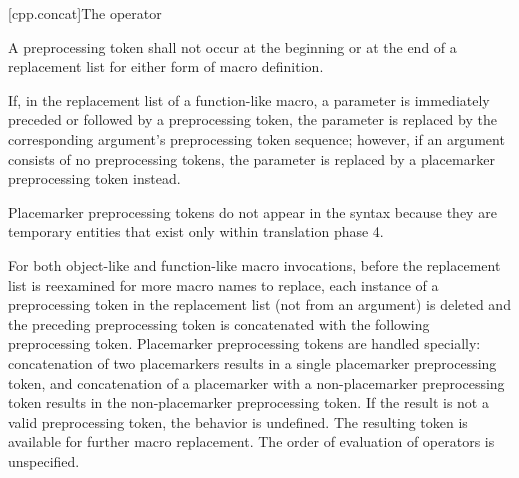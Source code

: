 \documentclass{wg21}
\begin{document}
[cpp.concat]{The \tcode{\#\#} operator}%
%

\pnum
A
\tcode{\#\#}
preprocessing token shall not occur at the beginning or
at the end of a replacement list for either form
of macro definition.

\pnum
If, in the replacement list of a function-like macro, a parameter is
immediately preceded or followed by a
\tcode{\#\#}
preprocessing token, the parameter is replaced by the
corresponding argument's preprocessing token sequence; however, if an argument consists of no preprocessing tokens, the parameter is
replaced by a placemarker preprocessing token instead.
\begin{footnote}
    Placemarker preprocessing tokens do not appear in the syntax
    because they are temporary entities that exist only within translation phase 4.
\end{footnote}

\pnum
For both object-like and function-like macro invocations, before the
replacement list is reexamined for more macro names to replace,
each instance of a
\tcode{\#\#}
preprocessing token in the replacement list
(not from an argument) is deleted and the
preceding preprocessing token is concatenated
with the following preprocessing token.
Placemarker preprocessing tokens are handled specially: concatenation
of two placemarkers results in a single placemarker preprocessing token, and
concatenation of a placemarker with a non-placemarker preprocessing token results
in the non-placemarker preprocessing token.
If the result is not a valid preprocessing token,
the behavior is undefined.
The resulting token is available for further macro replacement.
The order of evaluation of
\tcode{\#\#}
operators is unspecified.
\end{document}
